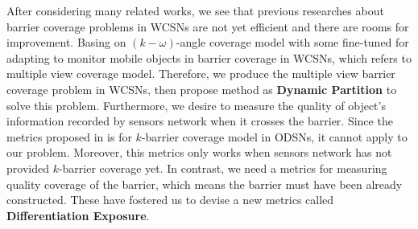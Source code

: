 After considering many related works, we see that previous researches about barrier coverage problems in WCSNs are not yet efficient and there are rooms for improvement. Basing on $(k-\omega)$-angle coverage model \cite{xu2016minimum} with some fine-tuned for adapting to monitor mobile objects in barrier coverage in WCSNs, which refers to multiple view coverage model. Therefore, we produce the multiple view barrier coverage problem in WCSNs, then propose method as \textcolor{ProcessBlue}{\bfseries Dynamic Partition} to solve this problem. Furthermore, we desire to measure the quality of object's information recorded by sensors network when it crosses the barrier. Since the metrics proposed in \cite{chen2008measuring} is for $k$-barrier coverage model in ODSNs, it cannot apply to our problem. Moreover, this metrics only works when sensors network has not provided $k$-barrier coverage yet. In contrast, we need a metrics for measuring quality coverage of the barrier, which means the barrier must have been already constructed. These have fostered us to devise a new metrics called \textcolor{ProcessBlue}{\bfseries Differentiation Exposure}.
